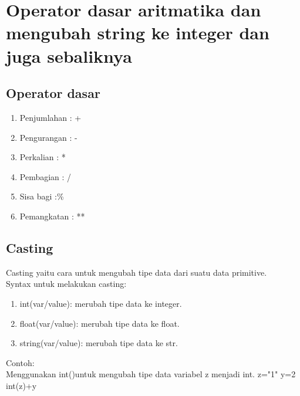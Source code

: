 \section*{Operator dasar aritmatika dan mengubah string ke integer dan juga sebaliknya }

\subsection*{Operator dasar}
\begin{enumerate}
\item Penjumlahan 	: +
\item Pengurangan 	: -
\item Perkalian 	: *
\item Pembagian 	: /
\item Sisa bagi		:\%
\item Pemangkatan	: **
\end{enumerate}
\subsection*{Casting}
\par
Casting yaitu cara untuk mengubah tipe data dari suatu data primitive.\\
Syntax untuk melakukan casting:\\
\begin{enumerate}
\item int(var/value): merubah tipe data ke integer.
\item float(var/value): merubah tipe data ke float.
\item string(var/value): merubah tipe data ke str.
\end{enumerate}
Contoh:\\
Menggunakan int()untuk mengubah tipe data variabel z menjadi int.
z="1"
y=2
int(z)+y
